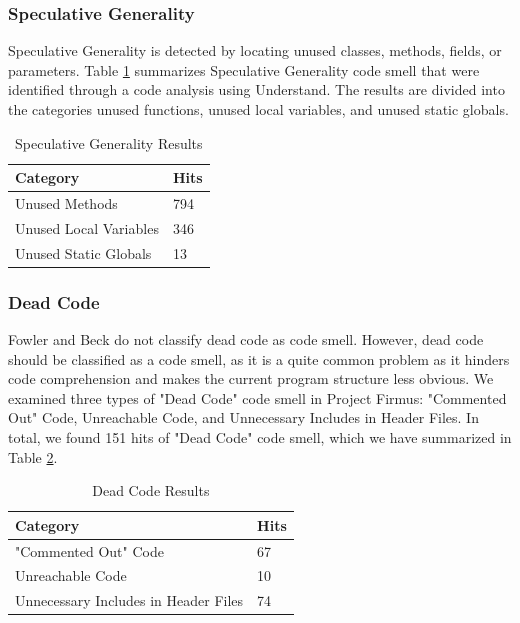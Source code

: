 \subsubsection{Speculative Generality}
Speculative Generality is detected by locating unused classes, methods, fields, or parameters. Table \ref{tab:speculativeGenerality} summarizes Speculative Generality code smell that were identified through a code analysis using Understand. The results are divided into the categories unused functions, unused local variables, and unused static globals. 

\begin{table}[]
\centering
\caption{Speculative Generality Results}
\label{tab:speculativeGenerality}
\begin{tabular}{|l|l|}
\hline
\textbf{Category}		& 	\textbf{Hits} \\ \hline
Unused Methods 			&	794  \\ \hline
Unused Local Variables 	& 	346	 \\ \hline
Unused Static Globals 	& 	13	 \\ \hline
\end{tabular}
\end{table}



\subsubsection{Dead Code}
Fowler and Beck\cite{1999:RID:311424} do not classify dead code as code smell. However, dead code should be classified as a code smell, as it is a quite common problem as it hinders code comprehension and makes the current program structure less obvious\cite{mantyla2003taxonomy}. We examined three types of "Dead Code" code smell in Project Firmus: "Commented Out" Code, Unreachable Code, and Unnecessary Includes in Header Files. In total, we found 151 hits of "Dead Code" code smell, which we have summarized in Table \ref{tab:deadCode}.

\begin{table}[]
\centering
\caption{Dead Code Results}
\label{tab:deadCode}
\begin{tabular}{|l|l|}
\hline
\textbf{Category}		& 	\textbf{Hits} \\ \hline
"Commented Out" Code 			&	67  \\ \hline
Unreachable Code 	& 	10	 \\ \hline
Unnecessary Includes in Header Files 	& 	74	 \\ \hline
\end{tabular}
\end{table}


